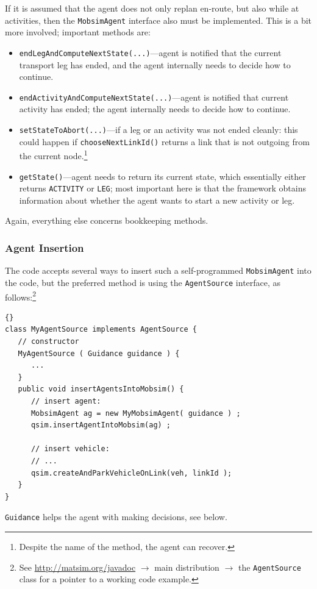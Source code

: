 If it is assumed that the agent does not only replan en-route, but also while at activities, then the \lstinline$MobsimAgent$ interface also must be implemented.  This is a bit more involved; important methods are:
\begin{itemize}\styleItemize
\item \lstinline$endLegAndComputeNextState(...)$---agent is notified that the current transport leg has ended, and the agent internally needs to decide how to continue.
\item \lstinline$endActivityAndComputeNextState(...)$---agent is notified that current activity has ended; the agent internally needs to decide how to continue.
\item \lstinline$setStateToAbort(...)$---if a leg or an activity was not ended cleanly: this could happen if \lstinline$chooseNextLinkId()$ returns a link that is not outgoing from the current node.\footnote{%
%
Despite the name of the method, the agent can recover.  %
}
\item \lstinline$getState()$---agent needs to return its current state, which essentially either returns \lstinline$ACTIVITY$ or \lstinline|LEG|; most important here  is that the framework obtains information about whether the agent wants to start a new activity or leg.
\end{itemize}
Again, everything else concerns bookkeeping methods.

\subsubsection{Agent Insertion}
The code accepts several ways to insert such a self-programmed \lstinline$MobsimAgent$ into the code, but the preferred method is using the \lstinline$AgentSource$ interface, as follows:\footnote{%
%
See \url{http://matsim.org/javadoc} $\to$ main distribution $\to$ the \lstinline{AgentSource} class for a pointer to a working code example.
%
}
\begin{lstlisting}[basicstyle=\footnotesize\tt]{}
class MyAgentSource implements AgentSource {
   // constructor
   MyAgentSource ( Guidance guidance ) {
      ...
   }
   public void insertAgentsIntoMobsim() {
      // insert agent:
      MobsimAgent ag = new MyMobsimAgent( guidance ) ;
      qsim.insertAgentIntoMobsim(ag) ;
        
      // insert vehicle:
      // ...
      qsim.createAndParkVehicleOnLink(veh, linkId );
   }
}
\end{lstlisting}
\lstinline$Guidance$ helps the agent with making decisions, see below.


